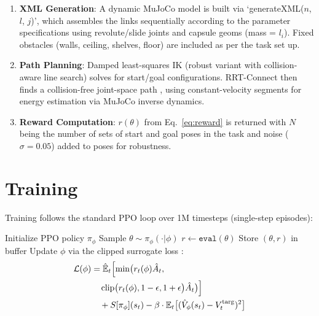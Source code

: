 \documentclass[defaultstyle,11pt]{thesis}
\begin{document}
\begin{enumerate}
    \item \textbf{XML Generation}: A dynamic MuJoCo model is built via `generateXML($n$, $l$, $j$)', which assembles the links sequentially according to the parameter specifications using revolute/slide joints and capsule geoms (mass = $l_i$). Fixed obstacles (walls, ceiling, shelves, floor) are included as per the task set up.
    \item \textbf{Path Planning}: Damped least-squares IK (robust variant with collision-aware line search) solves for start/goal configurations. RRT-Connect then finds a collision-free joint-space path \cite{kuffner2000rrt}, using constant-velocity segments for energy estimation via MuJoCo inverse dynamics.
    \item \textbf{Reward Computation}: \(r(\theta)\) from Eq.~\eqref{eq:reward} is returned with \(N\) being the number of sets of start and goal poses in the task and noise (\(\sigma=0.05\)) added to poses for robustness.
\end{enumerate}

\section{Training}

Training follows the standard PPO loop over 1M timesteps (single-step episodes):

\begin{algorithm}[H]
\caption{PMorph Training}
\label{alg:train}
\begin{algorithmic}[1]
\State Initialize PPO policy \(\pi_\phi\)
    \State Sample \(\theta \sim \pi_\phi(\cdot|\phi)\)
    \State \(r \gets \texttt{eval}(\theta)\) 
    \State Store \((\theta, r)\) in buffer
    \State Update \(\phi\) via the clipped surrogate loss \cite{schulman2017proximal}:
    \[
    \begin{aligned}
    \mathcal{L}(\phi) &= \hat{\mathbb{E}}_t \Bigl[ 
        \min\bigl( r_t(\phi) \hat{A}_t,\; \\
        &\quad \operatorname{clip}\bigl(r_t(\phi), 1-\epsilon, 1+\epsilon\bigr) \hat{A}_t \bigr) \Bigr] \\
        &\quad + S[\pi_\phi](s_t) - \beta \cdot \mathbb{E}_t \bigl[ (\hat{V}_\phi(s_t) - V_t^{\text{targ}})^2 \bigr]
    \end{aligned}
    \]
\EndFor
\end{algorithmic}
\end{algorithm}
\end{document}
